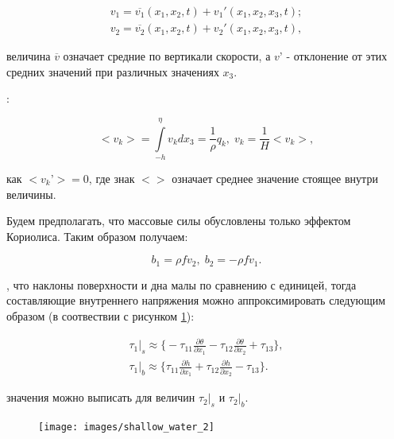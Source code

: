 \documentclass[14pt]{extreport}
\begin{document}
\begin{equation}\label{eq:shallow_water:13}
\begin{aligned}
v_1 = \overline{v_1} (x_1, x_2, t) + v_1'(x_1, x_2, x_3, t);\\
v_2 = \overline{v_2} (x_1, x_2, t) + v_2'(x_1, x_2, x_3, t),
\end{aligned}
\end{equation}

 величина $\overline{v}$ означает средние по вертикали скорости, а $v’$ - отклонение от этих средних значений при различных значениях $x_3$.

:

\begin{equation}\label{eq:shallow_water:14}
<v_k>=\int\limits^\eta_{-h} v_k dx_3 = \frac{1}{\rho} q_k, \; v_k=\frac{1}{H}<v_k>,
\end{equation}

 как $<v_k’> = 0$, где знак $<>$ означает среднее значение стоящее внутри величины.

Будем предполагать, что массовые силы обусловлены только эффектом Кориолиса. Таким образом получаем:

\begin{equation}\label{eq:shallow_water:15}
b_1 = \rho f v_2, \; b_2 = - \rho f v_1.
\end{equation}

, что наклоны поверхности и дна малы по сравнению с единицей, тогда составляющие внутреннего напряжения можно аппроксимировать следующим образом (в соотвествии с рисунком \ref{img:shallow_water:2}):

\begin{equation}\label{eq:shallow_water:16}
\begin{aligned}
 \tau_1\bigg|_s \approx \bigg\{ -\tau_{11}\frac{\partial \theta}{\partial x_1} -\tau_{12}\frac{\partial \theta}{\partial x_2} +\tau_{13}\bigg\}, \\
\tau_1\bigg|_b \approx \bigg\{ \tau_{11}\frac{\partial h}{\partial x_1} +\tau_{12}\frac{\partial h}{\partial x_2} -\tau_{13}\bigg\}.
\end{aligned}
\end{equation}

 значения можно выписать для величин $\tau_2|_s$ и $\tau_2|_b$.

\begin{figure}[H]
\centerline{
\texttt{[image: images/shallow\_water\_2]}}
\caption{}
\label{img:shallow_water:2}
\end{figure}
\end{document}
